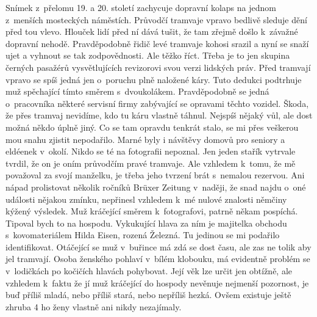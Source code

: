 
Snímek z~přelomu 19. a 20. století zachycuje dopravní kolaps na jednom
z~menších mosteckých náměstích. Průvodčí tramvaje vpravo bedlivě
sleduje dění před tou vlevo. Hlouček lidí před ní dává tušit, že tam
zřejmě došlo k~závažné dopravní nehodě. Pravděpodobně řidič levé
tramvaje kohosi srazil a nyní se snaží ujet a vyhnout se tak
zodpovědnosti. Ale těžko říct. Třeba je to jen skupina černých
pasažérů vysvětlujících revizorovi svou verzi lidských práv. Před
tramvají vpravo se spíš jedná jen o~poruchu plně naložené káry. Tuto
dedukci podtrhuje muž spěchající tímto směrem s~dvoukolákem.
Pravděpodobně se jedná o~pracovníka některé servisní firmy zabývající
se opravami těchto vozidel. Škoda, že přes tramvaj nevidíme, kdo tu
káru vlastně táhnul. Nejspíš nějaký vůl, ale dost možná někdo úplně
jiný. Co se tam opravdu tenkrát stalo, se mi přes veškerou mou snahu
zjistit nepodařilo. Marné byly i návštěvy domovů pro seniory a
eldéenek v~okolí. Nikdo se té na fotografii nepoznal. Jen jeden stařík
vytrvale tvrdil, že on je oním průvodčím pravé tramvaje. Ale vzhledem
k~tomu, že mě považoval za svojí manželku, je třeba jeho tvrzení brát
s~nemalou rezervou. Ani nápad prolistovat několik ročníků Brüxer
Zeitung v~naději, že snad najdu o~oné události nějakou zmínku,
nepřinesl vzhledem k~mé nulové znalosti němčiny kýžený výsledek. Muž
kráčející směrem k~fotografovi, patrně někam pospíchá. Tipoval bych to
na hospodu. Vykukující hlava za ním je majitelka obchodu
s~kovomateriálem Hilda Eisen, rozená Železná. Tu jedinou se mi podařilo
identifikovat. Otáčející se muž v~buřince má zdá se dost času, ale zas
ne tolik aby jel tramvají. Osoba ženského pohlaví v~bílém klobouku, má
evidentně problém se v~lodičkách po kočičích hlavách pohybovat. Její
věk lze určit jen obtížně, ale vzhledem k~faktu že jí muž kráčející do
hospody nevěnuje nejmenší pozornost, je buď příliš mladá, nebo příliš
stará, nebo nepříliš hezká. Ovšem existuje ještě zhruba 4%
ho ženy vlastně ani nikdy nezajímaly.

